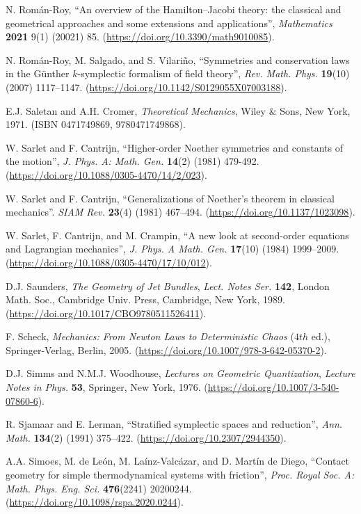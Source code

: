 \documentclass[12pt]{report}
\begin{document}
\begin{thebibliography}{999}
N. Rom\'an-Roy,
``An overview of the Hamilton--Jacobi theory: the classical and geometrical approaches and some extensions and applications'',
{\sl Mathematics} {\bf 2021} 9(1) (20021) 85.
(\url{https://doi.org/10.3390/math9010085}).

N. Rom\'an-Roy,  M. Salgado, and S. Vilari\~no,
 ``Symmetries and conservation laws in the G\"{u}nther $k$-symplectic formalism of field theory'',
{\sl Rev. Math. Phys.} {\bf 19}(10) (2007) 1117--1147.
(\url{https://doi.org/10.1142/S0129055X07003188}).

E.J. Saletan and A.H. Cromer,
{\it Theoretical Mechanics},
Wiley $\&$ Sons, New York, 1971.
(ISBN 0471749869, 9780471749868).

W. Sarlet and  F. Cantrijn,
 ``Higher-order Noether symmetries and constants of the motion'', 
{\sl J. Phys. A: Math. Gen.\/} {\bf 14}(2) (1981) 479-492.
(\url{https://doi.org/10.1088/0305-4470/14/2/023}).

{\rm W. Sarlet and F. Cantrijn}, 
``Generalizations of Noether's theorem in classical mechanics''. 
{\sl SIAM Rev.} {\bf 23}(4) (1981) 467–494.
(\url{https://doi.org/10.1137/1023098}).

W. Sarlet, F. Cantrijn, and  M. Crampin,
``A new look at second-order equations and Lagrangian mechanics'', 
{\sl J. Phys. A Math. Gen.} {\bf 17}(10) (1984) 1999--2009. 
(\url{https://doi.org/10.1088/0305-4470/17/10/012}).


D.J. {Saunders}, 
\emph{The Geometry of Jet Bundles}, 
{\sl Lect. Notes Ser.} {\bf 142}, London Math. Soc., Cambridge Univ. Press,
  Cambridge, New York, 1989.
(\url{https://doi.org/10.1017/CBO9780511526411}).

F. Scheck,
{\it Mechanics: From Newton Laws to Deterministic Chaos}
($4th$ ed.),
Springer-Verlag, Berlin, 2005.
(\url{https://doi.org/10.1007/978-3-642-05370-2}).

D.J. Simms and N.M.J. Woodhouse,
{\it Lectures on Geometric Quantization\/},
{\sl Lecture Notes in Phys.} {\bf 53},
Springer, New York, 1976.
(\url{https://doi.org/10.1007/3-540-07860-6}).

R. Sjamaar and E. Lerman,
``Stratified symplectic spaces and reduction'',
{\sl Ann. Math.} {\bf 134}(2) (1991) 375--422.
(\url{https://doi.org/10.2307/2944350}).

A.A. Simoes, M. de Le\'on, M. La\'inz-Valc\'azar, and D. Martín de Diego,
``Contact geometry for simple thermodynamical systems with friction'',
{\sl Proc. Royal Soc. A: Math. Phys. Eng. Sci.} {\bf 476}(2241) 20200244.
(\url{https://doi.org/10.1098/rspa.2020.0244}).


\end{thebibliography}
\end{document}
